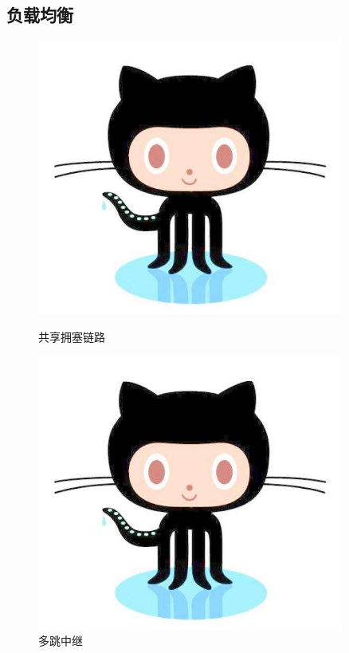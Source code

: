 \documentclass[winfonts,bachelor,oneside,nobackinfo]{njuthesis}
\begin{document}
\subsection{负载均衡}
\lipsum[1]

\begin{figure}[htbp]
\begin{minipage}[t]{0.5\textwidth}
\centering
\includegraphics[width=0.9\textwidth]{./figure/github.jpg}
\caption{共享拥塞链路}
\label{lab:1}
\end{minipage}%
\begin{minipage}[t]{0.5\textwidth}
\centering
\includegraphics[width=0.9\textwidth]{./figure/github.jpg}
\caption{多跳中继}
\label{lab:2}
\end{minipage}
\end{figure}
\end{document}
